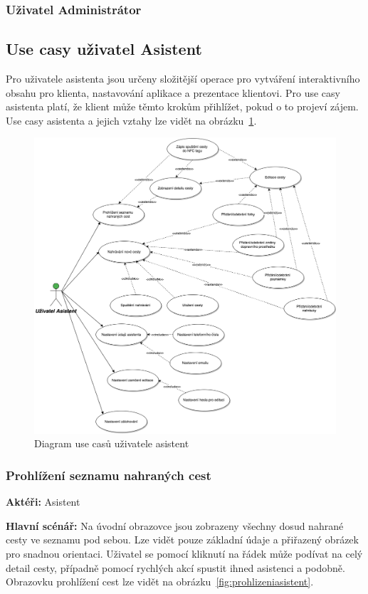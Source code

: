 \documentclass{article}
\newcommand{\usecase}[2]{\subsubsection{#1}\label{#2}}
\begin{document}
\subsubsection{Uživatel Administrátor}


\subsection{Use casy uživatel Asistent}
Pro uživatele asistenta jsou určeny složitější operace pro vytváření interaktivního obsahu pro klienta,
nastavování aplikace a prezentace klientovi. Pro use casy asistenta platí, že klient může těmto
krokům přihlížet, pokud o to projeví zájem. Use casy asistenta a jejich vztahy lze vidět na obrázku~\ref{fig:UseCasesAsistant}.

\begin{figure}[H]
        \centering
                \includegraphics[scale=0.2]{img/UseCasesAsistant.png}
        \caption{Diagram use casů uživatele asistent}
        \label{fig:UseCasesAsistant}
\end{figure}

\usecase{Prohlížení seznamu nahraných cest}{prohlizeniasistent}
\textbf{Aktéři:} Asistent

\vspace{0.1cm}
\noindent
\textbf{Hlavní scénář:} Na úvodní obrazovce jsou zobrazeny všechny dosud nahrané cesty ve seznamu pod sebou.
Lze vidět pouze základní údaje a přiřazený obrázek pro snadnou orientaci. Uživatel se pomocí
kliknutí na řádek může podívat na celý detail cesty, případně pomocí rychlých akcí spustit ihned asistenci
a podobně. Obrazovku prohlížení cest lze vidět na obrázku~\ref{fig:prohlizeniasistent}.
\end{document}

